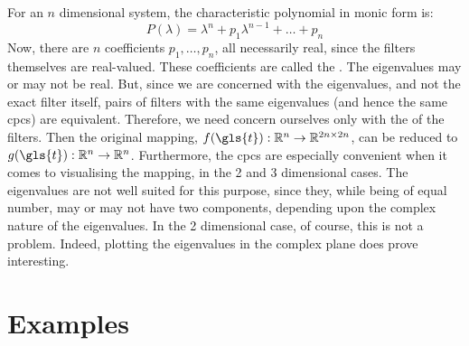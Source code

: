 For an $n$ dimensional system, the characteristic polynomial in monic form 
is:
\begin{equation}
P(\lambda) = \lambda^n + p_{1}\lambda^{n-1} + \ldots + p_{n}
\end{equation}
Now, there are $n$ coefficients $p_1, \ldots, p_n$, all necessarily real, 
since the filters themselves are real-valued. These coefficients are 
called the .  The eigenvalues may or may not be 
real. But, since we are concerned with the eigenvalues, and not the exact 
filter itself, pairs of filters with the same eigenvalues (and hence the 
same \glspl{cpc}) are equivalent. Therefore, we need concern ourselves 
only with the  of the filters. Then the original 
mapping, 
$f(\gls{t}):\mathbb{R}^n \rightarrow\mathbb{R}^{2n\times 2n}$,
can be reduced to 
$g(\gls{t}):\mathbb{R}^n\rightarrow\mathbb{R}^{n}$. 
Furthermore, the \glspl{cpc} are especially convenient when it comes to 
visualising the mapping, in the 2 and 3 dimensional cases. The eigenvalues
are not well suited for this purpose, since they, while being of equal 
number, may or may not have two components, depending upon the complex 
nature of the eigenvalues. In the 2 dimensional case, of course, this is 
not a problem. Indeed, plotting the eigenvalues in the complex plane 
does prove interesting.

\section{Examples}
